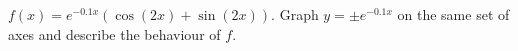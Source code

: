 {$f(x) = e^{-0.1x} \left( \cos(2x) + \sin(2x)\right)$.  Graph $y = \pm e^{-0.1x}$ on the same set of axes and  describe the behaviour of $f$.}
{}
